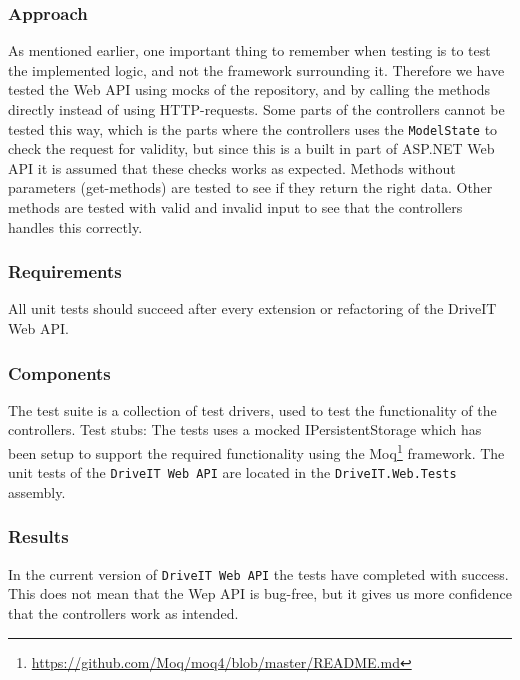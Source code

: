 \subsubsection{Approach}
As mentioned earlier, one important thing to remember when testing is to test the implemented logic, and not the framework surrounding it. Therefore we have tested the Web API using mocks of the repository, and by calling the methods directly instead of using HTTP-requests.
Some parts of the controllers cannot be tested this way, which is the parts where the controllers uses the \texttt{ModelState} to check the request for validity, but since this is a built in part of ASP.NET Web API it is assumed that these checks works as expected.
Methods without parameters (get-methods) are tested to see if they return the right data. Other methods are tested with valid and invalid input to see that the controllers handles this correctly.

\subsubsection{Requirements}
All unit tests should succeed after every extension or refactoring of the DriveIT Web API.

\subsubsection{Components}
The test suite is a collection of test drivers, used to test the functionality of the controllers.
Test stubs: The tests uses a mocked IPersistentStorage which has been setup to support the required functionality using the Moq\footnote{\url{https://github.com/Moq/moq4/blob/master/README.md}} framework.
The unit tests of the \texttt{DriveIT Web API} are located in the \texttt{DriveIT.Web.Tests} assembly.

\subsubsection{Results}
In the current version of \texttt{DriveIT Web API} the tests have completed with success. This does not mean that the Wep API is bug-free, but it gives us more confidence that the controllers work as intended.